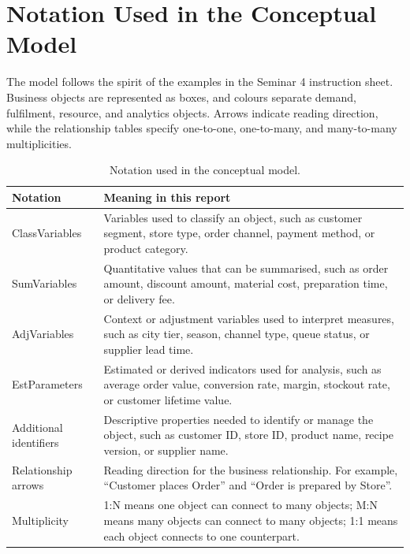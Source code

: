 \documentclass[12pt,a4paper]{article}
\begin{document}
\section{Notation Used in the Conceptual Model}

The model follows the spirit of the examples in the Seminar 4 instruction sheet. Business objects are represented as boxes, and colours separate demand, fulfilment, resource, and analytics objects. Arrows indicate reading direction, while the relationship tables specify one-to-one, one-to-many, and many-to-many multiplicities.

\begin{table}[H]
\centering
\caption{Notation used in the conceptual model.}
\begin{tabularx}{\textwidth}{P{4.2cm}Y}
\toprule
\textbf{Notation} & \textbf{Meaning in this report} \\
\midrule
\textcolor{lkblue}{ClassVariables} & Variables used to classify an object, such as customer segment, store type, order channel, payment method, or product category. \\
\textcolor{lkorange}{SumVariables} & Quantitative values that can be summarised, such as order amount, discount amount, material cost, preparation time, or delivery fee. \\
\textcolor{lkgreen}{AdjVariables} & Context or adjustment variables used to interpret measures, such as city tier, season, channel type, queue status, or supplier lead time. \\
\textcolor{lkpurple}{EstParameters} & Estimated or derived indicators used for analysis, such as average order value, conversion rate, margin, stockout rate, or customer lifetime value. \\
Additional identifiers & Descriptive properties needed to identify or manage the object, such as customer ID, store ID, product name, recipe version, or supplier name. \\
Relationship arrows & Reading direction for the business relationship. For example, ``Customer places Order'' and ``Order is prepared by Store''. \\
Multiplicity & 1:N means one object can connect to many objects; M:N means many objects can connect to many objects; 1:1 means each object connects to one counterpart. \\
\bottomrule
\end{tabularx}
\end{table}
\end{document}
